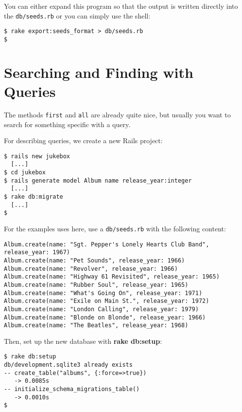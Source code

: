 \documentclass[a4paper]{book}
\newcounter{tab}[chapter]
\begin{document}
You can either expand this program so that the output is written directly into the \texttt{db/seeds.rb} or you can simply use the shell:

\begin{shaded}\begin{verbatim}
$ rake export:seeds_format > db/seeds.rb
$
\end{verbatim}\end{shaded}

\section{Searching and Finding with Queries}\label{searching-and-finding-with-queries}

The methods \texttt{first} and \texttt{all} are already quite nice, but usually you want to search for something specific with a query.

For describing queries, we create a new Rails project:

\begin{shaded}\begin{verbatim}
$ rails new jukebox
  [...]
$ cd jukebox
$ rails generate model Album name release_year:integer
  [...]
$ rake db:migrate
  [...]
$
\end{verbatim}\end{shaded}

For the examples uses here, use a \texttt{db/seeds.rb} with the following content:

\begin{shaded}\begin{verbatim}
Album.create(name: "Sgt. Pepper's Lonely Hearts Club Band", release_year: 1967)
Album.create(name: "Pet Sounds", release_year: 1966)
Album.create(name: "Revolver", release_year: 1966)
Album.create(name: "Highway 61 Revisited", release_year: 1965)
Album.create(name: "Rubber Soul", release_year: 1965)
Album.create(name: "What's Going On", release_year: 1971)
Album.create(name: "Exile on Main St.", release_year: 1972)
Album.create(name: "London Calling", release_year: 1979)
Album.create(name: "Blonde on Blonde", release_year: 1966)
Album.create(name: "The Beatles", release_year: 1968)
\end{verbatim}\end{shaded}

Then, set up the new database with \textbf{rake db:setup}:

\begin{shaded}\begin{verbatim}
$ rake db:setup
db/development.sqlite3 already exists
-- create_table("albums", {:force=>true})
   -> 0.0085s
-- initialize_schema_migrations_table()
   -> 0.0010s
$
\end{verbatim}\end{shaded}
\end{document}
